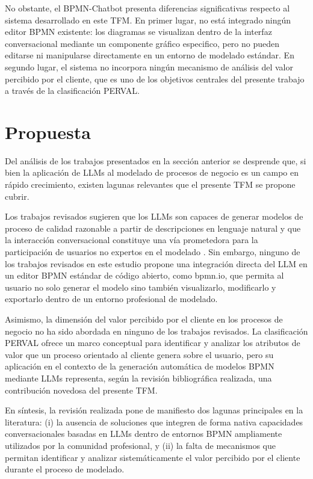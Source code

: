 No obstante, el BPMN-Chatbot presenta diferencias significativas respecto al sistema desarrollado en este TFM. En primer lugar, no está integrado 
 ningún editor BPMN existente: los diagramas se visualizan dentro de la interfaz conversacional mediante un componente gráfico especifico, 
 pero no pueden editarse ni manipularse directamente en un entorno de modelado estándar. En segundo lugar, el sistema no incorpora ningún 
 mecanismo de análisis del valor percibido por el cliente, que es uno de los objetivos centrales del presente trabajo a través de la 
 clasificación PERVAL.

\section{Propuesta}

Del análisis de los trabajos presentados en la sección anterior se desprende que, si bien la aplicación de LLMs al modelado de procesos de negocio 
es un campo en rápido crecimiento, existen lagunas relevantes que el presente TFM se propone cubrir.

Los trabajos revisados sugieren que los LLMs son capaces de generar modelos de proceso de calidad razonable a partir de descripciones en lenguaje natural
\cite{klievtsova2023,bise2025bpmn} y que la interacción conversacional constituye una vía prometedora para la participación
de usuarios no expertos en el modelado \cite{abb2023,fillies2024}. Sin embargo, ninguno de los trabajos revisados en este estudio propone una integración
directa del LLM en un editor BPMN estándar de código abierto, como bpmn.io, que permita al usuario no solo generar el modelo sino también
visualizarlo, modificarlo y exportarlo dentro de un entorno profesional de modelado.

Asimismo, la dimensión del valor percibido por el cliente en los procesos de negocio no ha sido abordada en ninguno de los trabajos revisados. La 
clasificación PERVAL ofrece un marco conceptual para identificar y analizar los atributos de valor que un proceso orientado al cliente genera 
sobre el usuario, pero su aplicación en el contexto de la generación automática de modelos BPMN mediante LLMs representa, según la revisión bibliográfica realizada, una contribución novedosa del
presente TFM.

En síntesis, la revisión realizada pone de manifiesto dos lagunas principales en la literatura: (i) la ausencia de soluciones que integren de forma nativa capacidades conversacionales basadas en LLMs dentro de entornos BPMN ampliamente utilizados por la comunidad profesional, y (ii) la falta de mecanismos que permitan identificar y analizar sistemáticamente el valor percibido por el cliente durante el proceso de modelado.

